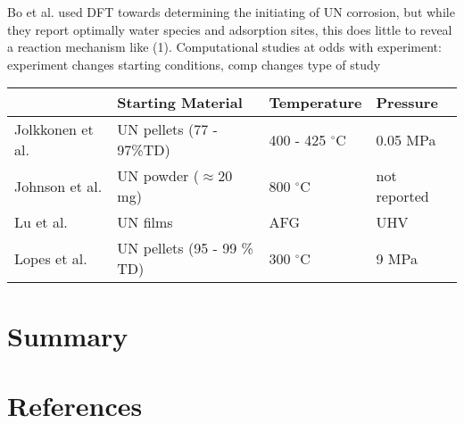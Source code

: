 \documentclass[3p,review,11pt]{elsarticle}
\begin{document}
Bo et al. \cite{Bo2016} used DFT towards determining the initiating of UN corrosion, but while they report optimally water species and adsorption sites, this does little to reveal a reaction mechanism like (1).
Computational studies at odds with experiment: experiment changes starting conditions, comp changes type of study


\begin{tabular}{ |p{3cm}|p{3cm}|p{3cm}|p{3cm}|  }
	\hline
	 & Starting Material &Temperature & Pressure\\
	\hline
	Jolkkonen et al. \cite{Jolkkonen2017}   &  UN pellets (77 - 97\%TD) &400 - 425 $^{\circ}$C&  0.05 MPa \\
	Johnson et al. \cite{Johnson2016}   & UN powder ($\approx$20 mg)     &800 $^{\circ}$C&  not reported \\
	Lu et al. \cite{Lu2016}  & UN films    &AFG&   UHV \\
	Lopes et al. \cite{Lopes2017}   & UN pellets (95 - 99 \% TD)    & 300 $^{\circ}$C&   9 MPa \\
	\hline
\end{tabular}
\section{Summary}











\section*{References}




\end{document}

